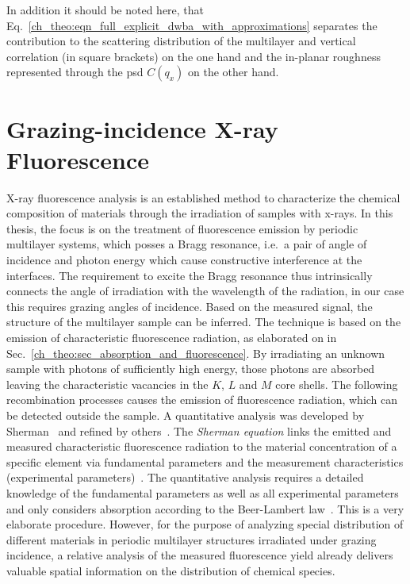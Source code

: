 In addition it should be noted here, that Eq.~\eqref{ch_theo:eqn_full_explicit_dwba_with_approximations} separates the contribution to the scattering distribution of the multilayer and vertical correlation (in square brackets) on the one hand and the in-planar roughness represented through the \gls{psd} $C(q_x)$ on the other hand.

\section{Grazing-incidence X-ray Fluorescence} \label{ch_theo:sec_xrf}
X-ray fluorescence analysis is an established method to characterize the chemical composition of materials through the irradiation of samples with x-rays. In this thesis, the focus is on the treatment of fluorescence emission by periodic multilayer systems, which posses a Bragg resonance, i.e.~a pair of angle of incidence and photon energy which cause constructive interference at the interfaces. The requirement to excite the Bragg resonance thus intrinsically connects the angle of irradiation with the wavelength of the radiation, in our case this requires grazing angles of incidence. Based on the measured signal, the structure of the multilayer sample can be inferred. The technique is based on the emission of characteristic fluorescence radiation, as elaborated on in Sec.~\ref{ch_theo:sec_absorption_and_fluorescence}. By irradiating an unknown sample with photons of sufficiently high energy, those photons are absorbed leaving the characteristic vacancies in the $K$, $L$ and $M$ core shells. The following recombination processes causes the emission of fluorescence radiation, which can be detected outside the sample. A quantitative analysis was developed by Sherman~\cite{sherman_theoretical_1955} and refined by others~\cite{shiraiwa_theoretical_1966, criss_calculation_1968, rasberry_calibration_1974}. The \emph{Sherman equation} links the emitted and measured characteristic fluorescence radiation to the material concentration of a specific element via fundamental parameters and the measurement characteristics (experimental parameters)~\cite{rousseau_fundamental_1984}. The quantitative analysis requires a detailed knowledge of the fundamental parameters as well as all experimental parameters and only considers absorption according to the Beer-Lambert law~\cite{als-nielsen_x-rays_2011}. This is a very elaborate procedure. However, for the purpose of analyzing special distribution of different materials in periodic multilayer structures irradiated under grazing incidence, a relative analysis of the measured fluorescence yield already delivers valuable spatial information on the distribution of chemical species.


